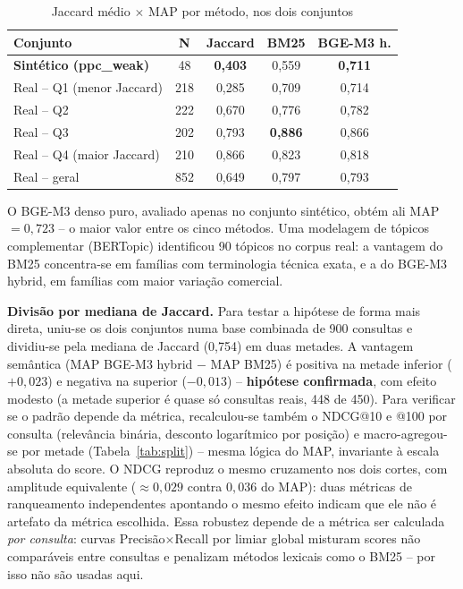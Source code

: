 \documentclass[12pt]{article}
\begin{document}
\begin{table}[ht]
\centering
\small
\caption{Jaccard m\'edio $\times$ MAP por m\'etodo, nos dois conjuntos}
\label{tab:jaccard}
\begin{tabular}{|l|c|c|c|c|}
\hline
\textbf{Conjunto} & \textbf{N} & \textbf{Jaccard} & \textbf{BM25} & \textbf{BGE-M3 h.} \\
\hline
\textbf{Sint\'etico (ppc\_weak)} & 48 & \textbf{0,403} & 0,559 & \textbf{0,711} \\
\hline
Real -- Q1 (menor Jaccard) & 218 & 0,285 & 0,709 & 0,714 \\
\hline
Real -- Q2 & 222 & 0,670 & 0,776 & 0,782 \\
\hline
Real -- Q3 & 202 & 0,793 & \textbf{0,886} & 0,866 \\
\hline
Real -- Q4 (maior Jaccard) & 210 & 0,866 & 0,823 & 0,818 \\
\hline
Real -- geral & 852 & 0,649 & 0,797 & 0,793 \\
\hline
\end{tabular}
\end{table}

O BGE-M3 denso puro, avaliado apenas no conjunto sint\'etico, obt\'em ali MAP$=0{,}723$ -- o maior valor entre os cinco m\'etodos. Uma modelagem de t\'opicos complementar (BERTopic) identificou 90 t\'opicos no corpus real: a vantagem do BM25 concentra-se em fam\'ilias com terminologia t\'ecnica exata, e a do BGE-M3 hybrid, em fam\'ilias com maior varia\c{c}\~ao comercial.

\textbf{Divis\~ao por mediana de Jaccard.} Para testar a hip\'otese de forma mais direta, uniu-se os dois conjuntos numa base combinada de 900 consultas e dividiu-se pela mediana de Jaccard (0,754) em duas metades. A vantagem sem\^antica (MAP BGE-M3 hybrid $-$ MAP BM25) \'e positiva na metade inferior ($+0{,}023$) e negativa na superior ($-0{,}013$) -- \textbf{hip\'otese confirmada}, com efeito modesto (a metade superior \'e quase s\'o consultas reais, 448 de 450). Para verificar se o padr\~ao depende da m\'etrica, recalculou-se tamb\'em o NDCG@10 e @100 por consulta (relev\^ancia bin\'aria, desconto logar\'itmico por posi\c{c}\~ao) e macro-agregou-se por metade (Tabela~\ref{tab:split}) -- mesma l\'ogica do MAP, invariante \`a escala absoluta do score. O NDCG reproduz o mesmo cruzamento nos dois cortes, com amplitude equivalente ($\approx0{,}029$ contra $0{,}036$ do MAP): duas m\'etricas de ranqueamento independentes apontando o mesmo efeito indicam que ele n\~ao \'e artefato da m\'etrica escolhida. Essa robustez depende de a m\'etrica ser calculada \emph{por consulta}: curvas Precis\~ao$\times$Recall por limiar global misturam scores n\~ao compar\'aveis entre consultas e penalizam m\'etodos lexicais como o BM25 -- por isso n\~ao s\~ao usadas aqui.
\end{document}
